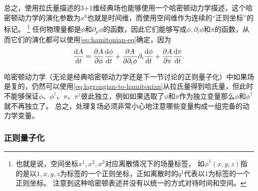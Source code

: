 \documentclass[UTF8, a4paper]{ctexart}
\begin{document}
总之，使用拉氏量描述的3+1维经典场也能够使用一个哈密顿动力学描述，这个哈密顿动力学的演化参数为$x^0$也就是时间维，而使用空间维作为连续的“正则坐标”的标记。%
\footnote{也就是说，空间坐标$x^1, x^2, x^3$对应离散情况下的场量标签，
如$\phi^1(x, y, z)$指的是以$1, x, y, z$为标签的一个正则坐标，正如离散时的$q^{1}$代表以$1$为标签的一个正则坐标。
注意到这种哈密顿表述并没有以统一的方式对待时间和空间。\label{note:spacial-label}}%
任何物理量都是$\phi$和$\partial_\mu \phi$的函数，因此它们能够写成$\phi, \partial_i \phi$和$\pi$的函数，从而它们的演化都可以使用\eqref{eq:hamitonian-eq}确定，因为
\begin{equation}
    \dv{A}{t} = \pdv{A}{\phi} \dv{\phi}{t} + \pdv{A}{\partial_i \phi} \partial_i \dv{\phi}{t} + \pdv{A}{\pi} \dv{\pi}{t}.
    \label{eq:evolution-of-any-quantity}
\end{equation}

哈密顿动力学（无论是经典哈密顿动力学还是下一节讨论的正则量子化）中如果场是复的，仍然可以使用\eqref{eq:lagrangian-to-hamitonian}从拉氏量得到哈氏量，但此时不能够保证$\phi$、$\phi^\dagger$、$\pi$、$\pi^\dagger$彼此独立，例如如果选取了$\phi$和$\pi$作为独立变量那么$\phi$和$\phi^\dagger$就不再独立了。
总之，处理复场必须非常小心地注意哪些变量构成一组完备的动力学变量。

\subsubsection{正则量子化}\label{sec:canonical-quantization}
\end{document}
